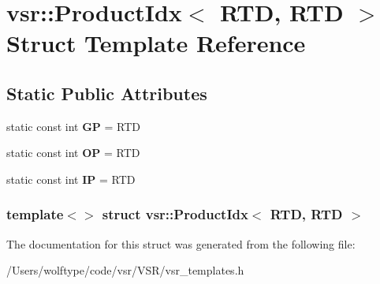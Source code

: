 \hypertarget{structvsr_1_1_product_idx_3_01_r_t_d_00_01_r_t_d_01_4}{\section{vsr\-:\-:Product\-Idx$<$ R\-T\-D, R\-T\-D $>$ Struct Template Reference}
\label{structvsr_1_1_product_idx_3_01_r_t_d_00_01_r_t_d_01_4}
}
\subsection*{Static Public Attributes}
\begin{DoxyCompactItemize}
\item 
\hypertarget{structvsr_1_1_product_idx_3_01_r_t_d_00_01_r_t_d_01_4_a2c54447eaf740cf687099fbc1c2e4213}{static const int {\bfseries G\-P} = R\-T\-D}\label{structvsr_1_1_product_idx_3_01_r_t_d_00_01_r_t_d_01_4_a2c54447eaf740cf687099fbc1c2e4213}

\item 
\hypertarget{structvsr_1_1_product_idx_3_01_r_t_d_00_01_r_t_d_01_4_ad7820e4e51a42600aee03beb9ae6b4d9}{static const int {\bfseries O\-P} = R\-T\-D}\label{structvsr_1_1_product_idx_3_01_r_t_d_00_01_r_t_d_01_4_ad7820e4e51a42600aee03beb9ae6b4d9}

\item 
\hypertarget{structvsr_1_1_product_idx_3_01_r_t_d_00_01_r_t_d_01_4_a176b5f50179f25d4bafde29b53576e04}{static const int {\bfseries I\-P} = R\-T\-D}\label{structvsr_1_1_product_idx_3_01_r_t_d_00_01_r_t_d_01_4_a176b5f50179f25d4bafde29b53576e04}

\end{DoxyCompactItemize}
\subsubsection*{template$<$$>$ struct vsr\-::\-Product\-Idx$<$ R\-T\-D, R\-T\-D $>$}



The documentation for this struct was generated from the following file\-:\begin{DoxyCompactItemize}
\item 
/\-Users/wolftype/code/vsr/\-V\-S\-R/vsr\-\_\-templates.\-h\end{DoxyCompactItemize}
